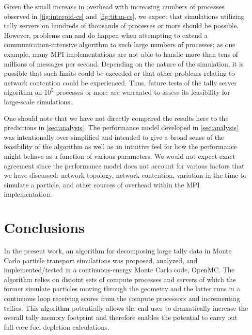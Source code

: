 \documentclass[3p,fleqn]{elsarticle}
\begin{document}
Given the small increase in overhead with increasing numbers of processes
observed in \autoref{fig:intrepid-cs} and \autoref{fig:titan-cs}, we expect that
simulations utilizing tally servers on hundreds of thousands of processes or
more should be possible. However, problems can and do happen when attempting to
extend a communication-intensive algorithm to such large numbers of processes;
as one example, many MPI implementations are not able to handle more than tens
of millions of messages per second. Depending on the nature of the simulation,
it is possible that such limits could be exceeded or that other problems
relating to network contention could be experienced. Thus, future tests of the
tally server algorithm on $10^5$ processes or more are warranted to assess its
feasibility for large-scale simulations.

One should note that we have not directly compared the results here to the
predictions in \autoref{sec:analysis}. The performance model developed in
\autoref{sec:analysis} was intentionally over-simplified and intended to give a
broad sense of the feasibility of the algorithm as well as an intuitive feel for
how the performance might behave as a function of various parameters. We would
not expect exact agreement since the performance model does not account for
various factors that we have discussed: network topology, network contention,
variation in the time to simulate a particle, and other sources of overhead
within the MPI implementation.

\section{Conclusions}

In the present work, an algorithm for decomposing large tally data in Monte
Carlo particle transport simulations was proposed, analyzed, and
implemented/tested in a continuous-energy Monte Carlo code, OpenMC. The
algorithm relies on disjoint sets of compute processes and servers of which the
former simulate particles moving through the geometry and the latter runs in a
continuous loop receiving scores from the compute processors and incrementing
tallies. This algorithm potentially allows the end user to dramatically increase
the overall tally memory footprint and therefore enables the potential to carry
out full core fuel depletion calculations.
\end{document}
